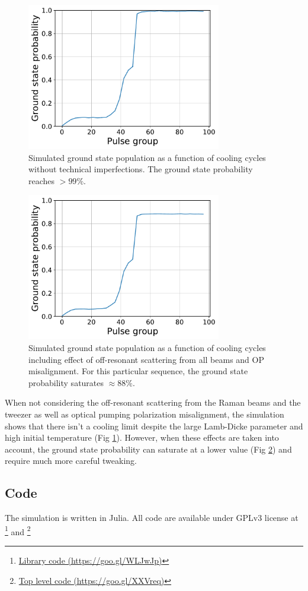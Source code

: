 \documentclass[aps,twocolumn,secnumarabic,balancelastpage,amsmath,amssymb]{revtex4}
\begin{document}
\begin{figure}
  \includegraphics[width=8.5cm]{imgs/simcool_no_scatter.pdf}
  \caption{Simulated ground state population as a function of cooling cycles without
    technical imperfections. The ground state probability reaches $>99\%$. \label{f-no-scatter}}
\end{figure}

\begin{figure}
  \includegraphics[width=8.5cm]{imgs/simcool_real.pdf}
  \caption{Simulated ground state population as a function of cooling cycles including effect of
    off-resonant scattering from all beams and OP misalignment.
    For this particular sequence, the ground state probability saturates $\approx88\%$.
    \label{f-real}}
\end{figure}

When not considering the off-resonant scattering from the Raman beams and the tweezer as well
as optical pumping polarization misalignment, the simulation shows that there isn't a cooling
limit despite the large Lamb-Dicke parameter and high initial temperature (Fig \ref{f-no-scatter}).
However, when these effects are taken into account, the ground state probability can saturate at
a lower value (Fig \ref{f-real}) and require much more careful tweaking.

\subsection{Code}

The simulation is written in Julia. All code are available under GPLv3 license at
\footnote{\href{https://goo.gl/WLJwJp}{Library code (https://goo.gl/WLJwJp)}} and
\footnote{\href{https://goo.gl/XXVreq}{Top level code (https://goo.gl/XXVreq)}}


\end{document}
